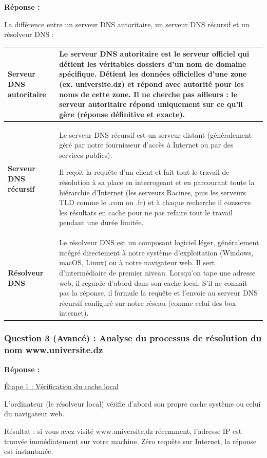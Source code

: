 \documentclass[12pt,a4paper]{article}
\newcommand{\reponse}{\textbf{Réponse :}\par}
\begin{document}
\reponse
La différence entre un serveur DNS autoritaire, un serveur DNS récursif
et un résolveur DNS :

\begin{longtable}{|L{3.4cm}|L{11.6cm}|}
\hline
\textbf{Serveur DNS autoritaire} &
Le serveur DNS autoritaire est le serveur officiel qui détient les
véritables dossiers d'un nom de domaine spécifique. Détient les données
officielles d'une zone (ex. universite.dz) et répond avec autorité pour
les noms de cette zone. Il ne cherche pas ailleurs : le serveur
autoritaire répond uniquement sur ce qu'il gère (réponse définitive et
exacte). \\ \hline
\textbf{Serveur DNS récursif} &
Le serveur DNS récursif est un serveur distant (généralement géré par
notre fournisseur d'accès à Internet ou par des services publics).

Il reçoit la requête d'un client et fait tout le travail de résolution
à sa place en interrogeant et en parcourant toute la hiérarchie
d'Internet (les serveurs Racines, puis les serveurs TLD comme le .com ou
.fr) et à chaque recherche il conserve les résultats en cache pour ne
pas refaire tout le travail pendant une durée limitée. \\ \hline
\textbf{Résolveur DNS} &
Le résolveur DNS est un composant logiciel léger, généralement intégré
directement à notre système d'exploitation (Windows, macOS, Linux) ou à
notre navigateur web. Il sert d'intermédiaire de premier niveau.
Lorsqu'on tape une adresse web, il regarde d'abord dans son cache local.
S'il ne connaît pas la réponse, il formule la requête et l'envoie au
serveur DNS récursif configuré sur notre réseau (comme celui des box
internet). \\ \hline
\end{longtable}

\subsubsection*{Question 3 (Avancé) : Analyse du processus de résolution du nom www.universite.dz}

\reponse
\underline{Étape 1 : Vérification du cache local}

L'ordinateur (le résolveur local) vérifie d'abord son propre cache
système ou celui du navigateur web.

Résultat : si vous avez visité www.universite.dz récemment, l'adresse
IP est trouvée immédiatement sur votre machine. Zéro requête sur
Internet, la réponse est instantanée.
\end{document}
